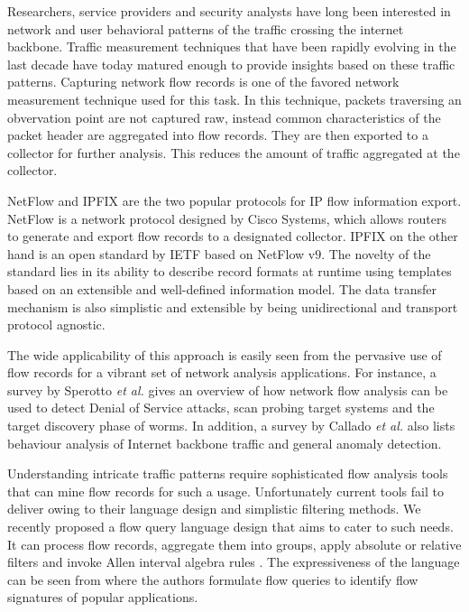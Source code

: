 Researchers, service providers and security analysts have long been interested
in network and user behavioral patterns of the traffic crossing the internet
backbone. Traffic measurement techniques that have been rapidly evolving in
the last decade have today matured enough to provide insights based on these
traffic patterns. Capturing network flow records is one of the favored network
measurement technique used for this task. In this technique, packets
traversing an obvervation point are not captured raw, instead common
characteristics of the packet header are aggregated into flow records. They
are then exported to a collector for further analysis.  This reduces the
amount of traffic aggregated at the collector.

NetFlow and \ac{IPFIX} are the two popular protocols for IP flow information
export. NetFlow \cite{rfc3954} is a network protocol designed by Cisco
Systems, which allows routers to generate and export flow records to a
designated collector. \ac{IPFIX} \cite{rfc5101} on the other hand is an open
standard by IETF based on NetFlow v$9$. The novelty of the standard lies in
its ability to describe record formats at runtime using templates based on an
extensible and well-defined information model. The data transfer mechanism is
also simplistic and extensible by being unidirectional and transport protocol
agnostic.

The wide applicability of this approach is easily seen from the pervasive use
of flow records for a vibrant set of network analysis applications. For
instance, a survey by Sperotto \textit{et al.} \cite{sperotto:2010} gives an
overview of how network flow analysis can be used to detect Denial of Service
attacks, scan probing target systems and the target discovery phase of worms.
In addition, a survey by Callado \textit{et al.} \cite{callado:2009} also
lists behaviour analysis of Internet backbone traffic and general anomaly
detection.

Understanding intricate traffic patterns require sophisticated flow analysis
tools that can mine flow records for such a usage.  Unfortunately current
tools fail to deliver owing to their language design and simplistic filtering
methods.  We recently proposed a flow query language design
\cite{vmarinov:2009} that aims to cater to such needs.  It can process
flow records, aggregate them into groups, apply absolute or relative filters
and invoke Allen interval algebra rules \cite{fallen:1983}. The expressiveness
of the language can be seen from \cite{vperelman:2011} where the authors
formulate flow queries to identify flow signatures of popular applications.

